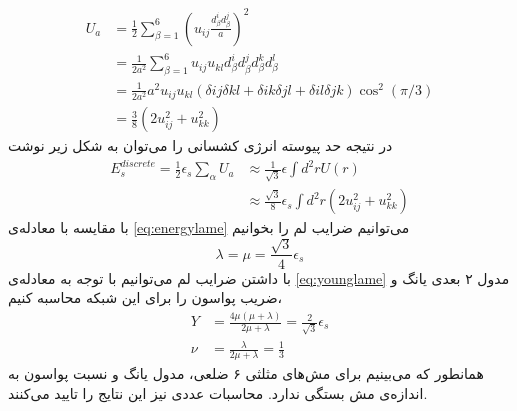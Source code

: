 \begin{equation}
\begin{aligned}
U_a&=\frac{1}{2}\sum_{\beta=1}^6(u_{ij}\frac{d_\beta^id_\beta^j}{a})^2\\
&=\frac{1}{2a^2}\sum_{\beta=1}^6u_{ij}u_{kl}d_\beta^id_\beta^jd_\beta^kd_\beta^l\\
&=\frac{1}{2a^2}a^2u_{ij}u_{kl}(\delta{ij}\delta{kl}+\delta{ik}\delta{jl}+\delta{il}\delta{jk})\cos^2(\pi/3)\\
&=\frac{3}{8}(2u_{ij}^2+u_{kk}^2)
\label{eq:gstrain1}
\end{aligned}
\end{equation}
در نتیجه‌ حد پیوسته انرژی کشسانی را می‌توان به شکل زیر نوشت
\begin{equation}
\begin{aligned}
E_s^{discrete}=\frac{1}{2}\epsilon_s\sum_\alpha U_a&\approx\frac{1}{\sqrt3}\epsilon\int d^2rU(r)\\
&\approx\frac{\sqrt3}{8}\epsilon_s\int d^2r(2u_{ij}^2+u_{kk}^2)
\end{aligned}
\end{equation}
با مقایسه با معادله‌ی 
\ref{eq:energylame}
می‌توانیم ضرایب لم را بخوانیم
\begin{equation}
\lambda=\mu=\frac{\sqrt3}{4}\epsilon_s
\end{equation}
با داشتن ضرایب لم می‌توانیم با توجه به معادله‌ی 
\ref{eq:younglame}
مدول ۲ بعدی یانگ و ضریب پواسون را برای این شبکه محاسبه کنیم،
\begin{equation}
\begin{aligned}
Y&=\frac{4\mu(\mu+\lambda)}{2\mu+\lambda}=\frac{2}{\sqrt3}\epsilon_s\\
\nu&=\frac{\lambda}{2\mu+\lambda}=\frac{1}{3}
\end{aligned}
\end{equation}
همانطور که می‌بینیم برای مش‌های مثلثی ۶ ضلعی، مدول یانگ و نسبت پواسون به اندازه‌ی مش بستگی ندارد. محاسبات عددی
\cite{springnetworkPRE2011}
نیز این نتایج را تایید می‌کنند.



















